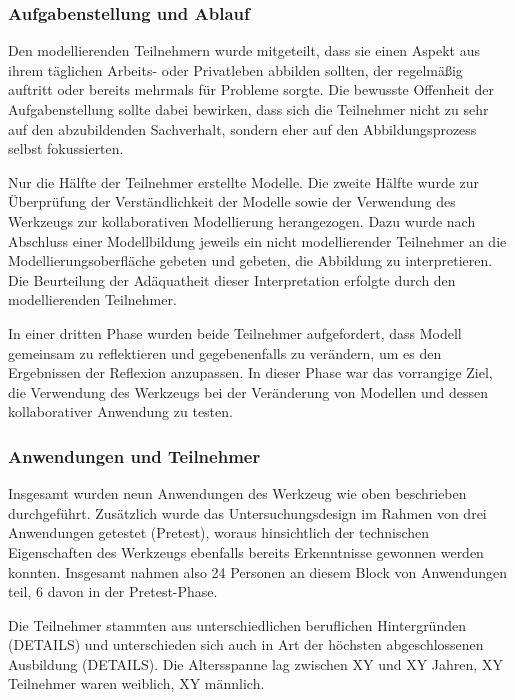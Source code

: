 
\subsubsection{Aufgabenstellung und Ablauf} %
\label{ssub:1_aufgabenstellung}

Den modellierenden Teilnehmern wurde mitgeteilt, dass sie einen Aspekt aus ihrem täglichen Arbeits- oder Privatleben abbilden sollten, der regelmäßig auftritt oder bereits mehrmals für Probleme sorgte. Die bewusste Offenheit der Aufgabenstellung sollte dabei bewirken, dass sich die Teilnehmer nicht zu sehr auf den abzubildenden Sachverhalt, sondern eher auf den Abbildungsprozess selbst fokussierten.

Nur die Hälfte der Teilnehmer erstellte Modelle. Die zweite Hälfte wurde zur Überprüfung der Verständlichkeit der Modelle sowie der Verwendung des Werkzeugs zur kollaborativen Modellierung herangezogen. Dazu wurde nach Abschluss einer Modellbildung jeweils ein nicht modellierender Teilnehmer an die Modellierungsoberfläche gebeten und gebeten, die Abbildung zu interpretieren. Die Beurteilung der Adäquatheit dieser Interpretation erfolgte durch den modellierenden Teilnehmer.

In einer dritten Phase wurden beide Teilnehmer aufgefordert, dass Modell gemeinsam zu reflektieren und gegebenenfalls zu verändern, um es den Ergebnissen der Reflexion anzupassen. In dieser Phase war das vorrangige Ziel, die Verwendung des Werkzeugs bei der Veränderung von Modellen und dessen kollaborativer Anwendung zu testen. 


\subsubsection{Anwendungen und Teilnehmer} %
\label{ssub:1_teilnehmer}

Insgesamt wurden neun Anwendungen des Werkzeug wie oben beschrieben durchgeführt. Zusätzlich wurde das Untersuchungsdesign im Rahmen von drei Anwendungen getestet (Pretest), woraus hinsichtlich der technischen Eigenschaften des Werkzeugs ebenfalls bereits Erkenntnisse gewonnen werden konnten. Insgesamt nahmen also 24 Personen an diesem Block von Anwendungen teil, 6 davon in der Pretest-Phase.

Die Teilnehmer stammten aus unterschiedlichen beruflichen Hintergründen (DETAILS) und unterschieden sich auch in Art der höchsten abgeschlossenen Ausbildung (DETAILS). Die Altersspanne lag zwischen XY und XY Jahren, XY Teilnehmer waren weiblich, XY männlich.

